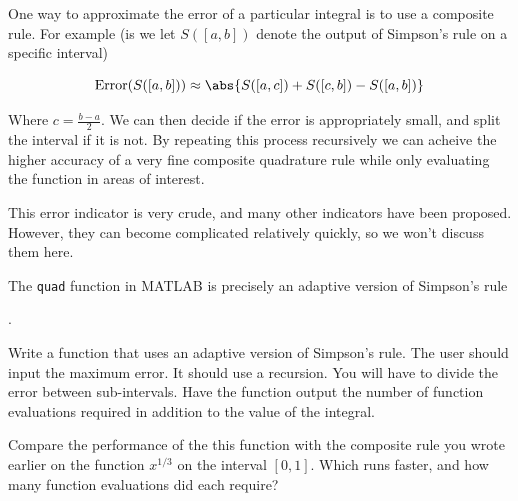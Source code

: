 One way to approximate the error of a particular integral is to use a composite rule. For example (is we let $S([a,b])$ denote the output of Simpson's rule on a specific interval)

\[
\mbox{Error}(S([a,b])) \approx \abs{S([a,c]) + S([c,b]) - S([a,b])}
\]

Where $c = \frac{b-a}{2}$. We can then decide if the error is appropriately small, and split the interval if it is not. By repeating this process recursively we can acheive the higher accuracy of a very fine composite quadrature rule while only evaluating the function in areas of interest.

This error indicator is very crude, and many other indicators have been proposed. However, they can become complicated relatively quickly, so we won't discuss them here. \begin{matlab} The {\tt quad} function in MATLAB is precisely an adaptive version of Simpson's rule \end{matlab}.

\begin{problem}
Write a function that uses an adaptive version of Simpson's rule. The user should input the maximum error. It should use a recursion. You will have to divide the error between sub-intervals. Have the function output the number of function evaluations required in addition to the value of the integral.

Compare the performance of the this function with the composite rule you wrote earlier on the function $x^{1/3}$ on the interval $[0,1]$. Which runs faster, and how many function evaluations did each require?
\end{problem}
